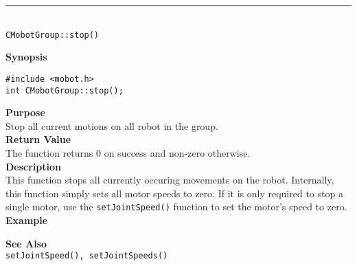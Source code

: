\noindent
\vspace{5pt}
\rule{4.5in}{0.015in}\\
\noindent
{\LARGE \texttt{CMobotGroup::stop()}}\\
{}

\noindent
{\bf Synopsis}
\vspace{-8pt}
\begin{verbatim}
#include <mobot.h>
int CMobotGroup::stop();
\end{verbatim}

\noindent
{\bf Purpose}\\
Stop all current motions on all robot in the group.\\

\noindent
{\bf Return Value}\\
The function returns 0 on success and non-zero otherwise.\\

\noindent
{\bf Description}\\
This function stops all currently occuring movements on the robot. Internally, this function simply sets all motor speeds to zero. If it is only required to stop a single motor, use the 
\texttt{setJointSpeed()} function to set the motor's speed to zero. \\

\noindent
{\bf Example}\\
\noindent

\noindent
{\bf See Also}\\
\texttt{setJointSpeed(), setJointSpeeds()}

